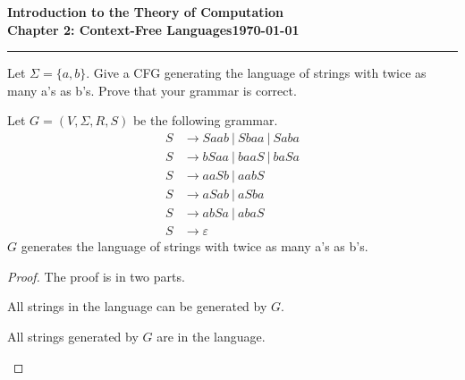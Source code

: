 \documentclass[11pt]{article}
\newcommand{\dated}{\today}
\begin{document}
\textbf{Introduction to the Theory of
Computation}\hfill\textbf{\myname}\\[0.01in]
\textbf{Chapter 2: Context-Free Languages}\hfill\textbf{\dated}\\
\smallskip\hrule\bigskip

\begin{problem}{2.21}
Let $\Sigma = \{a,b\}$. Give a CFG generating the language of strings with twice as many a’s as b’s. Prove that your grammar is correct.
\end{problem}

\begin{solution}
Let $G = (V, \Sigma, R, S)$ be the following grammar.
\begin{align*}
S &\rightarrow Saab \ | \ Sbaa \ | \ Saba \\
S &\rightarrow bSaa \ | \ baaS \ | \ baSa \\
S &\rightarrow aaSb \ | \ aabS \\
S &\rightarrow aSab \ | \ aSba \\
S &\rightarrow abSa \ | \ abaS \\
S &\rightarrow \varepsilon
\end{align*}
$G$ generates the language of strings with twice as many a’s as b’s.
\end{solution}

\begin{proof}
The proof is in two parts.

\begin{problem}[Part]{1}
All strings in the language can be generated by $G$.
\end{problem}

\begin{problem}[Part]{2}
All strings generated by $G$ are in the language.
\end{problem}
\end{proof}
\end{document}
